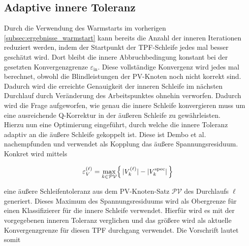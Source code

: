 

\subsection{Adaptive innere Toleranz}
\label{subsec:ergebnisse_adaptiv}


Durch die Verwendung des Warmstarts im vorherigen \cref{subsec:ergebnisse_warmstart} kann bereits die Anzahl der inneren Iterationen reduziert werden, indem der Startpunkt der TPF-Schleife jedes mal besser geschätzt wird.
Dort bleibt die innere Abbruchbedingung konstant bei der gesetzten Konvergenzgrenze $\varepsilon_{\mathrm{in}}$.
Diese vollständige Konvergenz wird jedes mal berechnet, obwohl die Blindleistungen der PV-Knoten noch nicht korrekt sind.
Dadurch wird die erreichte Genauigkeit der inneren Schleife im nächsten Durchlauf durch Veränderung des Arbeitspunktes ohnehin verworfen.
Dadurch wird die Frage aufgeworfen, wie genau die innere Schleife konvergieren muss um eine ausreichende Q-Korrektur in der äußeren Schleife zu gewährleisten.\\

Hierzu nun eine Optimierung eingeführt, durch welche die innere Toleranz adaptiv an die äußere Schleife gekoppelt ist.
Diese ist Dembo et al.~\cite{Dembo1982} nachempfunden und verwendet als Kopplung das äußere Spannungsresiduum.
Konkret wird mittels 

\begin{equation}
	\varepsilon_V^{(\ell)}
	= \max_{k\in\mathcal{PV}}
	\Bigl\{\,|V_k^{(\ell)}| - |V_k^{\mathrm{spec}}|\,\Bigl\}
\end{equation}

eine äußere Schleifentoleranz aus dem PV-Knoten-Satz $\mathcal{PV}$ des Durchlaufs $\ell$ generiert.
Dieses Maximum des Spannungsresiduums wird als Obergrenze für einen Klassifizierer für die innere Schleife verwendet.
Hierfür wird es mit der vorgegebenen inneren Toleranz verglichen und das größere wird als aktuelle Konvergenzgrenze für diesen TPF durchgang verwendet.
Die Vorschrift lautet somit

